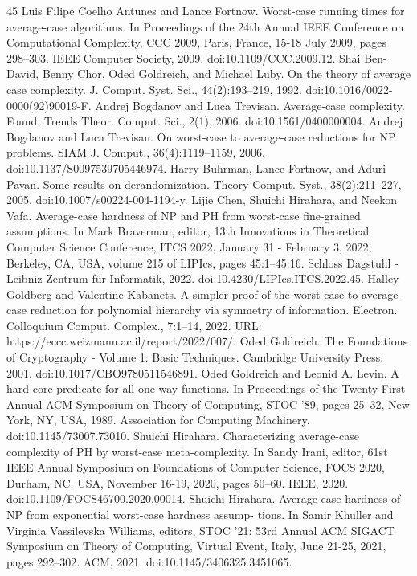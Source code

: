 \begin{thebibliography}{45}
 Luis Filipe Coelho Antunes and Lance Fortnow. Worst-case running times for average-case algorithms. In Proceedings of the 24th Annual IEEE Conference on Computational Complexity, CCC 2009, Paris, France, 15-18 July 2009, pages 298–303. IEEE Computer Society, 2009. doi:10.1109/CCC.2009.12.
 Shai Ben-David, Benny Chor, Oded Goldreich, and Michael Luby. On the theory of average case complexity. J. Comput. Syst. Sci., 44(2):193–219, 1992. doi:10.1016/0022-0000(92)90019-F.
 Andrej Bogdanov and Luca Trevisan. Average-case complexity. Found. Trends Theor. Comput. Sci., 2(1), 2006. doi:10.1561/0400000004.
 Andrej Bogdanov and Luca Trevisan. On worst-case to average-case reductions for NP problems. SIAM J. Comput., 36(4):1119–1159, 2006. doi:10.1137/S0097539705446974.
 Harry Buhrman, Lance Fortnow, and Aduri Pavan. Some results on derandomization. Theory Comput. Syst., 38(2):211–227, 2005. doi:10.1007/s00224-004-1194-y.
 Lijie Chen, Shuichi Hirahara, and Neekon Vafa. Average-case hardness of NP and PH from worst-case fine-grained assumptions. In Mark Braverman, editor, 13th Innovations in Theoretical Computer Science Conference, ITCS 2022, January 31 - February 3, 2022, Berkeley, CA, USA, volume 215 of LIPIcs, pages 45:1–45:16. Schloss Dagstuhl - Leibniz-Zentrum für Informatik, 2022. doi:10.4230/LIPIcs.ITCS.2022.45.
 Halley Goldberg and Valentine Kabanets. A simpler proof of the worst-case to average-case reduction for polynomial hierarchy via symmetry of information. Electron. Colloquium Comput. Complex., 7:1–14, 2022. URL: https://eccc.weizmann.ac.il/report/2022/007/.
 Oded Goldreich. The Foundations of Cryptography - Volume 1: Basic Techniques. Cambridge University Press, 2001. doi:10.1017/CBO9780511546891.
 Oded Goldreich and Leonid A. Levin. A hard-core predicate for all one-way functions. In Proceedings of the Twenty-First Annual ACM Symposium on Theory of Computing, STOC ’89, pages 25–32, New York, NY, USA, 1989. Association for Computing Machinery. doi:10.1145/73007.73010.
 Shuichi Hirahara. Characterizing average-case complexity of PH by worst-case meta-complexity. In Sandy Irani, editor, 61st IEEE Annual Symposium on Foundations of Computer Science, FOCS 2020, Durham, NC, USA, November 16-19, 2020, pages 50–60. IEEE, 2020. doi:10.1109/FOCS46700.2020.00014.
 Shuichi Hirahara. Average-case hardness of NP from exponential worst-case hardness assump- tions. In Samir Khuller and Virginia Vassilevska Williams, editors, STOC ’21: 53rd Annual ACM SIGACT Symposium on Theory of Computing, Virtual Event, Italy, June 21-25, 2021, pages 292–302. ACM, 2021. doi:10.1145/3406325.3451065.

\end{thebibliography}
